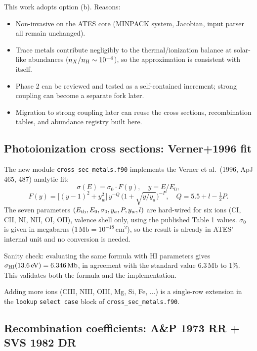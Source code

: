 \documentclass[english,a4paper]{kiseon_memo}
\begin{document}
This work adopts option (b). Reasons:
\begin{itemize}
\item Non-invasive on the ATES core (MINPACK system, Jacobian, input parser
all remain unchanged).
\item Trace metals contribute negligibly to the thermal/ionization balance
at solar-like abundances ($n_X / n_{\rm H} \sim 10^{-4}$), so the
approximation is consistent with itself.
\item Phase 2 can be reviewed and tested as a self-contained increment;
strong coupling can become a separate fork later.
\item Migration to strong coupling later can reuse the cross sections,
recombination tables, and abundance registry built here.
\end{itemize}

\subsection{Photoionization cross sections: Verner+1996 fit}

The new module \texttt{cross\_sec\_metals.f90} implements the Verner et al.\
(1996, ApJ 465, 487) analytic fit:
\[
\sigma(E) = \sigma_0 \cdot F(y), \quad y = E / E_0,
\]
\[
F(y) = \big[(y - 1)^2 + y_w^2 \big]\, y^{-Q}\,\big(1 + \sqrt{y / y_a}\big)^{-P},
\quad Q = 5.5 + l - \tfrac{1}{2} P.
\]
The seven parameters $(E_{\rm th}, E_0, \sigma_0, y_a, P, y_w, l)$ are
hard-wired for six ions (CI, CII, NI, NII, OI, OII), valence shell only,
using the published Table 1 values. $\sigma_0$ is given in megabarns
($1\,\mathrm{Mb} = 10^{-18}\,\mathrm{cm}^2$), so the result is already in
ATES' internal unit and no conversion is needed.

Sanity check: evaluating the same formula with HI parameters gives
$\sigma_{\rm HI}(13.6\,\mathrm{eV}) = 6.346\,\mathrm{Mb}$, in agreement with
the standard value $6.3\,\mathrm{Mb}$ to 1\%. This validates both the formula
and the implementation.

Adding more ions (CIII, NIII, OIII, Mg, Si, Fe, ...) is a single-row
extension in the \texttt{lookup} \texttt{select case} block of
\texttt{cross\_sec\_metals.f90}.

\subsection{Recombination coefficients: A\&P 1973 RR + SVS 1982 DR}
\end{document}

